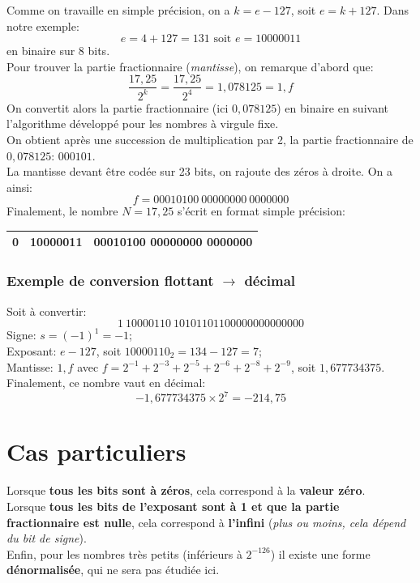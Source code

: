 \documentclass[11pt, french]{article}
\begin{document}
Comme on travaille en simple précision, on a \(k=e-127\), soit \(e=k+127\). Dans
notre exemple: $$e=4+127=131 \mbox{ soit } e=10000011$$ en binaire sur 8
bits.\\
Pour trouver la partie fractionnaire (\emph{mantisse}), on remarque d'abord
que: \[\dfrac{17,25}{2^k}=\dfrac{17,25}{2^4}=1,078125=1,f\]
On convertit alors la partie fractionnaire (ici \(0,078125\)) en binaire
en suivant l'algorithme développé pour les nombres à virgule fixe.\\
On obtient après une succession de multiplication par 2, la partie
fractionnaire de \(0,078125\): \(000101\).\\
La mantisse devant être codée sur 23 bits, on rajoute des zéros à
droite. On a ainsi: \[f=00010100\ 00000000\ 0000000\]
Finalement, le nombre \(N=17,25\) s'écrit en format simple précision:
\begin{table}[!h]
\centering
\begin{tabular}{|l|l|l|}
\hline
0 & 10000011 & 00010100 00000000 0000000 \\ \hline
\end{tabular}
\end{table}

    \hypertarget{exemple-de-conversion-flottant---duxe9cimal}{%
\subsubsection{Exemple de conversion flottant $\rightarrow$ décimal}\label{exemple-de-conversion-flottant---duxe9cimal}}

    Soit à convertir: \[1\ 10000110\ 10101101100000000000000\] Signe:
\(s=(-1)^1=-1\);\\
Exposant: \(e-127\), soit \(10000110_2 = 134-127=7\);\\
Mantisse: \(1,f\) avec \(f=2^{-1}+2^{-3}+2^{-5}+2^{-6}+2^{-8}+2^{-9}\),
soit \(1,677734375\).\\
Finalement, ce nombre vaut en décimal: \[-1,677734375\times 2^7=-214,75\]

    \hypertarget{cas-particuliers}{%
\section{Cas particuliers}\label{cas-particuliers}}

Lorsque \textbf{tous les bits sont à zéros}, cela correspond à la \textbf{valeur zéro}.\\
Lorsque \textbf{tous les bits de l'exposant sont à 1 et que la partie fractionnaire est nulle}, cela correspond à \textbf{l'infini} (\emph{plus ou moins, cela
dépend du bit de signe}).\\ Enfin, pour les nombres très petits (inférieurs
à \(2^{-126}\)) il existe une forme \textbf{dénormalisée}, qui ne sera pas
étudiée ici.
\end{document}
